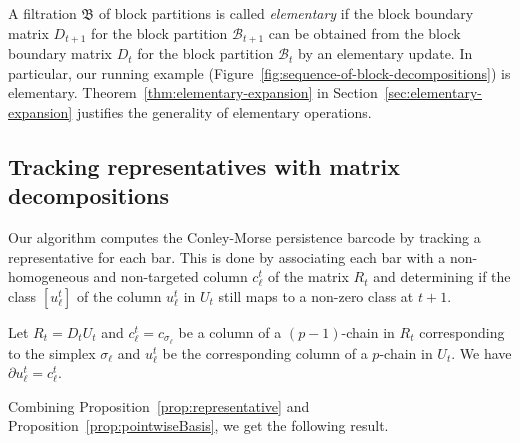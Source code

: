 \documentclass[letterpaper,11pt]{article}
\theoremstyle{plain}
\newtheorem{theorem}{Theorem}[section]
\theoremstyle{definition}
\newcounter{li}
\newcommand{\zzBD}{\mathfrak{B}}
\newcommand\michal[1]{\textcolor{ForestGreen}{[ML: #1]}}
\newcommand{\md}{\mathcal{B}}
\begin{document}
A filtration $\zzBD$ of block partitions is called \emph{elementary} if the
block boundary matrix $D_{t+1}$ for the block partition $\md_{t+1}$ can be obtained
from the block boundary matrix $D_t$ for the block partition $\md_t$ by an
elementary update.
In particular, our running example (Figure~\ref{fig:sequence-of-block-decompositions}) is elementary. Theorem~\ref{thm:elementary-expansion} in Section~\ref{sec:elementary-expansion} justifies the generality of elementary operations.
    
\subsection{Tracking representatives with matrix decompositions}
Our algorithm computes the Conley-Morse persistence barcode by tracking a representative for each
bar. This is done by associating each bar with a non-homogeneous and non-targeted column $c_\ell^t$ of the matrix $R_t$ and determining if the class $[u_\ell^t]$ of the column $u_\ell^t$ in $U_t$ still maps to a non-zero class at $t+1$.
   
    Let $R_t=D_tU_t$ and $c_\ell^t=c_{\sigma_\ell}$ be a column of a $(p-1)$-chain in $R_t$ corresponding to the simplex $\sigma_\ell$ and $u_\ell^t$ be the corresponding column of a $p$-chain in $U_t$. We have $\partial u_\ell^t=c_\ell^t$.

Combining Proposition~\ref{prop:representative} and Proposition~\ref{prop:pointwiseBasis}, we get
the following result.
\end{document}
